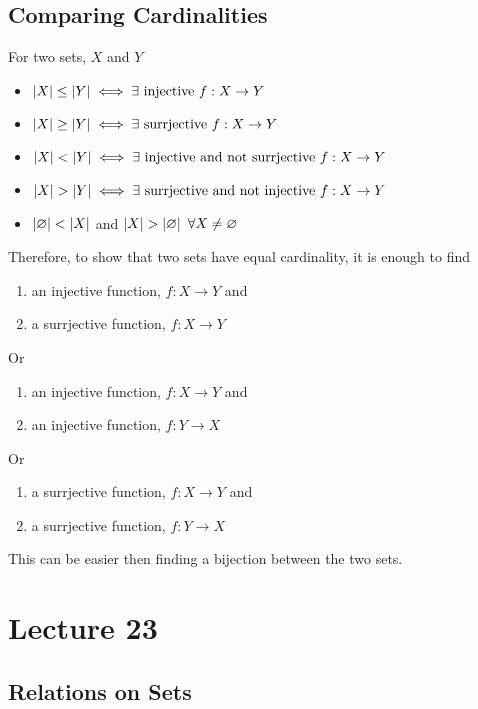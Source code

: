 \documentclass{report}
\begin{document}
\subsection*{Comparing Cardinalities}
For two sets, $X$ and $Y$ 
\begin{itemize}
	\item $\abs{X}\leq\abs{Y}\iff \exists\ \text{injective}\ f:X\to Y$
	\item $\abs{X}\geq\abs{Y}\iff \exists\ \text{surrjective}\ f:X\to Y$
	\item $\abs{X}<\abs{Y}\iff \exists\ \text{injective and not surrjective}\ f:X\to Y$
	\item $\abs{X}>\abs{Y}\iff \exists\ \text{surrjective and not injective}\ f:X\to Y$
	\item $\left| \varnothing \right| < \left| X \right|$ and $\left| X \right| > \left| \varnothing \right|$ $\forall X\neq\varnothing$
\end{itemize}

Therefore, to show that two sets have equal cardinality, it is enough to find
\begin{enumerate}
	\item an injective function, $f:X\to Y$ and
	\item a surrjective function, $f:X\to Y$
\end{enumerate}
Or
\begin{enumerate}
	\item an injective function, $f:X\to Y$ and
	\item an injective function, $f:Y\to X$ 
\end{enumerate}
Or
\begin{enumerate}
	\item a surrjective function, $f:X\to Y$ and
	\item a surrjective function, $f:Y\to X$ 
\end{enumerate}
This can be easier then finding a bijection between the two sets.

\section{Lecture 23}
\subsection*{Relations on Sets}
\end{document}
